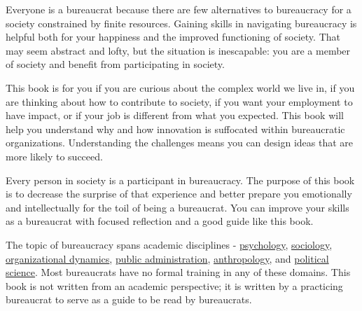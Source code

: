 Everyone is a bureaucrat because there are few alternatives to bureaucracy for a society constrained by finite resources. Gaining skills in navigating bureaucracy is helpful both for your happiness and the improved functioning of society. That may seem abstract and lofty, but the situation is inescapable: you are a member of society and benefit from participating in society. 



This book is for you if you are curious about the complex world we live in,  if you are thinking about how to contribute to society,  if you want your employment to have impact, or if your job is different from what you expected. This book will help you understand why and how innovation is suffocated within bureaucratic organizations. Understanding the challenges means you can design ideas that are more likely to succeed.


Every person in society is a participant in bureaucracy. The purpose of this book is to decrease the surprise of that experience and better prepare you emotionally and intellectually for the toil of being a bureaucrat. You can improve your skills as a bureaucrat with focused reflection and a good guide like this book. 

The topic of bureaucracy spans academic disciplines - \href{https://en.wikipedia.org/wiki/Psychology}{psychology},
\iftoggle{WPinmargin}{\marginpar{$>$Wikipedia: psychology}}{}
\href{https://en.wikipedia.org/wiki/Sociology}{sociology},
\href{https://en.wikipedia.org/wiki/Organizational_behavior}{organizational dynamics},
\href{https://en.wikipedia.org/wiki/Public_administration}{public administration}, 
\href{https://en.wikipedia.org/wiki/Anthropology}{anthropology},
and  
\href{https://en.wikipedia.org/wiki/Political_science}{political science}. 
Most bureaucrats have no formal training in any of these domains. This book is not written from an academic perspective; it is written by a practicing bureaucrat to serve as a guide to be read by bureaucrats. 


